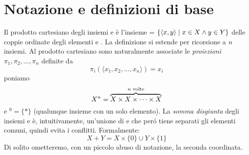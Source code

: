 \section{Notazione e definizioni di base}
Il prodotto cartesiano degli insiemi  e  è l'insieme  = $\{\langle x, y \rangle \hspace{1mm}|\hspace{1mm} x \in X \land y \in Y\}$ delle coppie ordinate degli elementi  e . La definizione si estende per ricorsione a \textit{n} insiemi. Al prodotto cartesiano  sono naturalmente associate le \textit{proiezioni} $\pi_1, \pi_2, \dots, \pi_n$ definite da
\begin{equation}
    \pi_i(\langle x_1, x_2, \dots, x_n \rangle) = x_i
\end{equation}
poniamo
\begin{equation}
    X^n = \overbrace{X \times X \times \dots \times X}^{\textnormal{$n$ volte}}
\end{equation}
e $^0 = \{*\}$ (qualunque insieme con un solo elemento). La \textit{somma disgiunta} degli insiemi  e  è, intuitivamente, un'unione di  e  che peró tiene separati gli elementi comuni, quindi evita i conflitti. Formalmente:
\begin{equation}
    X + Y = X \times \{0\} \cup Y \times \{1\}
\end{equation}
Di solito ometteremo, con un piccolo abuso di notazione, la seconda coordinata.
